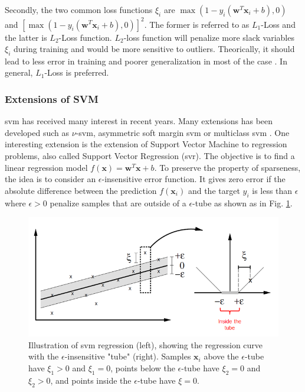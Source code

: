 Secondly, the two common loss functions $\xi_i$ are $\max(1-y_i (\textbf{w}^T \textbf{x}_i+b), 0)$ and $[\max(1-y_i(\textbf{w}^T \textbf{x}_i+b), 0)]^2$. The former is referred to as $L_1$-Loss and the latter is $L_2$-Loss function. $L_2$-loss function will penalize more slack variables $\xi_i$ during training and would be more sensitive to outliers. Theorically, it should lead to less error in training and poorer generalization in most of the case \cite{Hsu2008}. In general, $L_1$-Loss is preferred.



\subsubsection{Extensions of SVM}
{\sc svm} has received many interest in recent years. Many extensions has been developed such as $\nu$-{\sc svm}, asymmetric soft margin {\sc svm} or multiclass {\sc svm} \cite{Kijsirikul2002,Crammer2001}. One interesting extension is the extension of Support Vector Machine to regression problems, also called Support Vector Regression ({\sc svr}). The objective is to find a linear regression model $f(\textbf{x})=\textbf{w}^T\textbf{x}+b$. To preserve the property of sparseness, the idea is to consider an $\epsilon$-insensitive error function. It gives zero error if the absolute difference between
the prediction $f(\textbf{x}_i)$ and the target $y_i$ is less than $\epsilon$ where $\epsilon > 0$ penalize samples that are outside of a $\epsilon$-tube as shown as in Fig. \ref{fig:SVR_tube}.

\begin{figure}[h!]
\centering
\includegraphics[width=0.8\linewidth]{images/SVR_tube}
\caption[Illustration of {\sc svm} regression (left), showing the regression curve with the $\epsilon$-insensitive "tube" (right).]{Illustration of {\sc svm} regression (left), showing the regression curve with the $\epsilon$-insensitive "tube" (right). Samples $\textbf{x}_i$ above the $\epsilon$-tube have $\xi_1 > 0$ and $\xi_1 = 0$, points below the $\epsilon$-tube have $\xi_2 = 0$ and $\xi_2 > 0$, and points inside the $\epsilon$-tube have $\xi = 0$.}
\label{fig:SVR_tube}
\end{figure}

